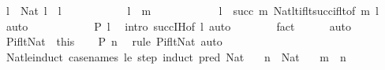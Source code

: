 \begin{isabellebody}
\ {\isachardoublequoteopen}l{\isacharprime}{\kern0pt}\ {\isacharcolon}{\kern0pt}\ Nat{\isachardoublequoteclose}\ {\isachardoublequoteopen}l{\isacharprime}{\kern0pt}\ {\isacharless}{\kern0pt}\ l{\isachardoublequoteclose}\isanewline
\ \ \ \ \ \ \ \ \isamarkupfalse%
\ \isamarkupfalse%
\ {\isachardoublequoteopen}l{\isacharprime}{\kern0pt}\ {\isacharless}{\kern0pt}\ m{\isachardoublequoteclose}\isanewline
\ \ \ \ \ \ \ \ \ \ \isamarkupfalse%
\ {\isacartoucheopen}l\ {\isacharless}{\kern0pt}\ succ\ m{\isacartoucheclose}\ Nat{\isacharunderscore}{\kern0pt}lt{\isacharunderscore}{\kern0pt}if{\isacharunderscore}{\kern0pt}lt{\isacharunderscore}{\kern0pt}succ{\isacharunderscore}{\kern0pt}if{\isacharunderscore}{\kern0pt}lt{\isacharbrackleft}{\kern0pt}of\ m\ l{\isacharprime}{\kern0pt}{\isacharbrackright}{\kern0pt}\ \isamarkupfalse%
\ auto\isanewline
\ \ \ \ \ \ \ \ \isamarkupfalse%
\ \isamarkupfalse%
\ {\isachardoublequoteopen}P\ l{\isacharprime}{\kern0pt}{\isachardoublequoteclose}\ \isamarkupfalse%
\ {\isacharparenleft}{\kern0pt}intro\ succ{\isachardot}{\kern0pt}IH{\isacharbrackleft}{\kern0pt}of\ l{\isacharprime}{\kern0pt}{\isacharbrackright}{\kern0pt}{\isacharparenright}{\kern0pt}\ auto\isanewline
\ \ \ \ \ \ \isamarkupfalse%
\ fact\isanewline
\ \ \ \ \isamarkupfalse%
\ auto\isanewline
\ \ \isacommand{{\isacharbraceright}{\kern0pt}}\isamarkupfalse%
\isanewline
\ \ \isamarkupfalse%
\ P{\isacharunderscore}{\kern0pt}if{\isacharunderscore}{\kern0pt}lt{\isacharunderscore}{\kern0pt}Nat\ {\isacharequal}{\kern0pt}\ this\isanewline
\ \ \isamarkupfalse%
\ {\isachardoublequoteopen}P\ n{\isachardoublequoteclose}\ \isamarkupfalse%
\ {\isacharparenleft}{\kern0pt}rule\ P{\isacharunderscore}{\kern0pt}if{\isacharunderscore}{\kern0pt}lt{\isacharunderscore}{\kern0pt}Nat{\isacharparenright}{\kern0pt}\ auto\isanewline
{}\isamarkupfalse%
%
\endisatagproof
{\isafoldproof}%
%
\isadelimproof
\isanewline
%
\endisadelimproof
\isanewline
{}\isamarkupfalse%
\ Nat{\isacharunderscore}{\kern0pt}le{\isacharunderscore}{\kern0pt}induct\ {\isacharbrackleft}{\kern0pt}case{\isacharunderscore}{\kern0pt}names\ le\ step{\isacharcomma}{\kern0pt}\ induct\ pred{\isacharcolon}{\kern0pt}\ Nat{\isacharbrackright}{\kern0pt}{\isacharcolon}{\kern0pt}\isanewline
\ \ \ {\isachardoublequoteopen}n\ {\isacharcolon}{\kern0pt}\ Nat{\isachardoublequoteclose}\isanewline
\ \ \ {\isachardoublequoteopen}m\ {\isasymle}\ n{\isachardoublequoteclose}\isanewline

\end{isabellebody}
